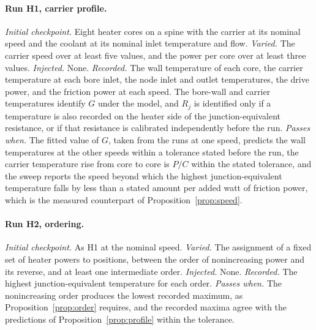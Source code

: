 \documentclass[11pt,openany]{book}
\theoremstyle{plain}
\theoremstyle{definition}
\theoremstyle{remark}
\begin{document}
\paragraph{Run H1, carrier profile.} \emph{Initial checkpoint.} Eight heater cores on a spine with the carrier at its nominal speed and the coolant at its nominal inlet temperature and flow. \emph{Varied.} The carrier speed over at least five values, and the power per core over at least three values. \emph{Injected.} None. \emph{Recorded.} The wall temperature of each core, the carrier temperature at each bore inlet, the node inlet and outlet temperatures, the drive power, and the friction power at each speed. The bore-wall and carrier temperatures identify $G$ under the model, and $R_j$ is identified only if a temperature is also recorded on the heater side of the junction-equivalent resistance, or if that resistance is calibrated independently before the run. \emph{Passes when.} The fitted value of $G$, taken from the runs at one speed, predicts the wall temperatures at the other speeds within a tolerance stated before the run, the carrier temperature rise from core to core is $P/C$ within the stated tolerance, and the sweep reports the speed beyond which the highest junction-equivalent temperature falls by less than a stated amount per added watt of friction power, which is the measured counterpart of Proposition~\ref{prop:speed}.

\paragraph{Run H2, ordering.} \emph{Initial checkpoint.} As H1 at the nominal speed. \emph{Varied.} The assignment of a fixed set of heater powers to positions, between the order of nonincreasing power and its reverse, and at least one intermediate order. \emph{Injected.} None. \emph{Recorded.} The highest junction-equivalent temperature for each order. \emph{Passes when.} The nonincreasing order produces the lowest recorded maximum, as Proposition~\ref{prop:order} requires, and the recorded maxima agree with the predictions of Proposition~\ref{prop:profile} within the tolerance.
\end{document}
